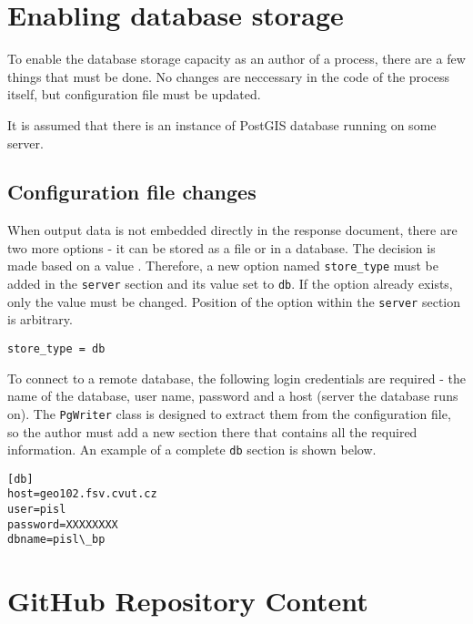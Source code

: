 \chapter{Enabling database storage}
\label{Enabling-database-storage}

To enable the database storage capacity as an author of a process, there are a few things that must be done. No changes are neccessary in the code of the process itself, but configuration file must be updated. 

It is assumed that there is an instance of PostGIS database running on some server.


\section{Configuration file changes}

When output data is not embedded directly in the response document, there are two more options - it can be stored as a file or in a database. The decision is made based on a value . Therefore, a new option named \texttt{store\_type} must be added in the \texttt{server} section and its value set to \texttt{db}. If the option already exists, only the value must be changed. Position of the option within the \texttt{server} section is arbitrary.

\begin{verbatim}
store_type = db
\end{verbatim}


To connect to a remote database, the following login credentials are required - the name of the database, user name, password and a host (server the database runs on). The \texttt{PgWriter} class is designed to extract them from the configuration file, so the author must add a new section there that contains all the required information. An example of a complete  \texttt{db} section is shown below.

\begin{verbatim}
[db]
host=geo102.fsv.cvut.cz
user=pisl
password=XXXXXXXX
dbname=pisl\_bp
\end{verbatim}







\chapter{GitHub Repository Content}
\label{cd}


